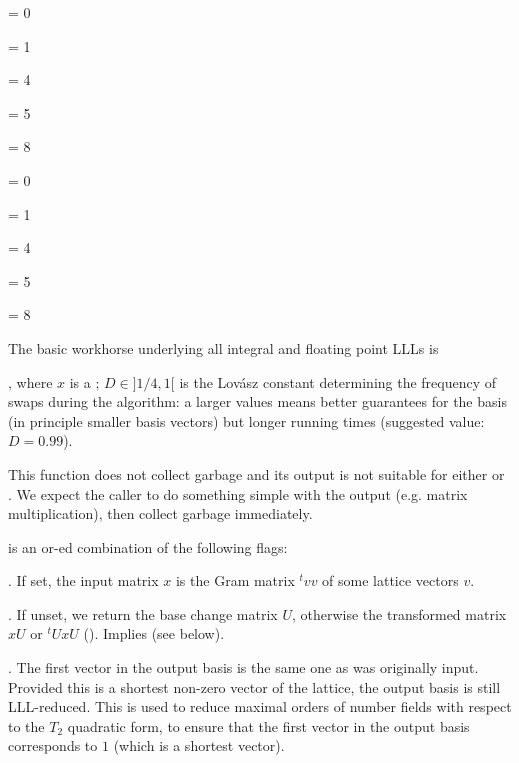  \fl = 0

 \fl = 1

 \fl = 4

 \fl = 5

 \fl = 8

\item {}

 \fl = 0

 \fl = 1

 \fl = 4

 \fl = 5

 \fl = 8

\smallskip

The basic workhorse underlying all integral and floating point LLLs is

, where $x$ is a ;
$D \in ]1/4,1[$ is the Lov\'{a}sz constant determining the frequency of
swaps during the algorithm: a larger values means better guarantees for
the basis (in principle smaller basis vectors) but longer running times
(suggested value: $D = 0.99$).

 This function does not collect garbage and its output
is not suitable for either  or . We expect
the caller to do something simple with the output (e.g. matrix
multiplication), then collect garbage immediately.

\noindent{} is an or-ed combination of the following flags:

\item  {}. If set, the input matrix $x$ is the Gram matrix ${}^t
v v$ of some lattice vectors $v$.

\item  {}. If unset, we return the base change matrix $U$,
otherwise the transformed matrix $x U$ or ${}^t U x U$ ().
Implies  (see below).

\item  {}. The first vector in the output basis is the same
one as was originally input. Provided this is a shortest non-zero vector of
the lattice, the output basis is still LLL-reduced. This is used to reduce
maximal orders of number fields with respect to the $T_2$ quadratic form, to
ensure that the first vector in the output basis corresponds to $1$ (which is
a shortest vector).

